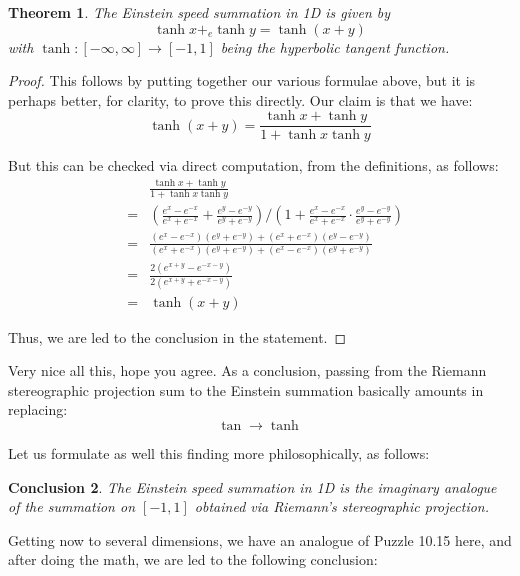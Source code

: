 \documentclass[12pt]{amsbook}
\newtheorem{theorem}{Theorem}[chapter]
\newtheorem{conclusion}[theorem]{Conclusion}
\begin{document}
\begin{theorem}
The Einstein speed summation in 1D is given by
$$\tanh x+_e\tanh y=\tanh(x+y)$$
with $\tanh:[-\infty,\infty]\to[-1,1]$ being the hyperbolic tangent function.
\end{theorem}

\begin{proof}
This follows by putting together our various formulae above, but it is perhaps better, for clarity, to prove this directly. Our claim is that we have: 
$$\tanh(x+y)=\frac{\tanh x+\tanh y}{1+\tanh x\tanh y}$$

But this can be checked via direct computation, from the definitions, as follows:
\begin{eqnarray*}
&&\frac{\tanh x+\tanh y}{1+\tanh x\tanh y}\\
&=&\left(\frac{e^x-e^{-x}}{e^x+e^{-x}}+\frac{e^y-e^{-y}}{e^y+e^{-y}}\right)
\Big/\left(1+\frac{e^x-e^{-x}}{e^x+e^{-x}}\cdot\frac{e^y-e^{-y}}{e^y+e^{-y}}\right)\\
&=&\frac{(e^x-e^{-x})(e^y+e^{-y})+(e^x+e^{-x})(e^y-e^{-y})}{(e^x+e^{-x})(e^y+e^{-y})+(e^x-e^{-x})(e^y+e^{-y})}\\
&=&\frac{2(e^{x+y}-e^{-x-y})}{2(e^{x+y}+e^{-x-y})}\\
&=&\tanh(x+y)
\end{eqnarray*}

Thus, we are led to the conclusion in the statement.
\end{proof}

Very nice all this, hope you agree. As a conclusion, passing from the Riemann stereographic projection sum to the Einstein summation basically amounts in replacing:
$$\tan\to\tanh$$

Let us formulate as well this finding more philosophically, as follows:

\begin{conclusion}
The Einstein speed summation in 1D is the imaginary analogue of the summation on $[-1,1]$ obtained via Riemann's stereographic projection.
\end{conclusion}

Getting now to several dimensions, we have an analogue of Puzzle 10.15 here, and after doing the math, we are led to the following conclusion:

\end{document}
